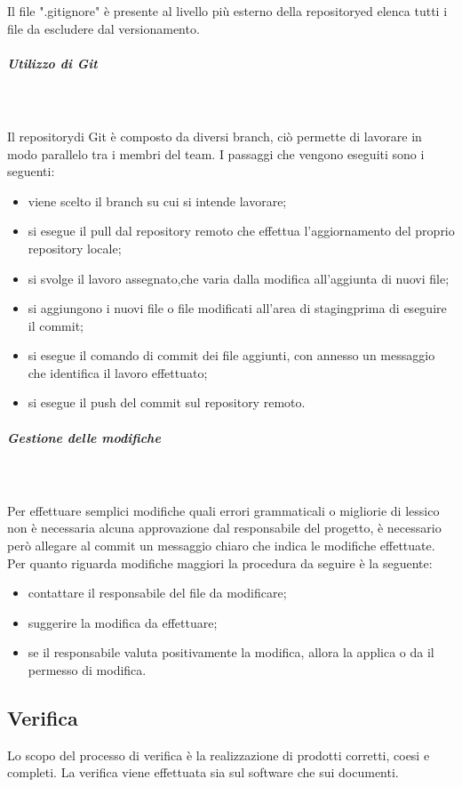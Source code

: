 	Il file ".gitignore" è presente al livello più esterno della repository\glosp ed elenca tutti i file da escludere dal versionamento. 
	\subparagraph{Utilizzo di Git} \mbox{}\\ \mbox{}\\
	Il repository\glosp di Git è composto da diversi branch, ciò permette di lavorare in modo parallelo tra i membri del team.  
	I passaggi che vengono eseguiti sono i seguenti:
	\begin{itemize}
		\item viene scelto il branch su cui si intende lavorare;
		\item si esegue il pull dal repository remoto che effettua l'aggiornamento del proprio repository locale;
		\item si svolge il lavoro assegnato,che varia dalla modifica all'aggiunta di nuovi file;
		\item si aggiungono i nuovi file o file modificati all'area di staging\glosp prima di eseguire il commit;
		\item si esegue il comando di commit dei file aggiunti, con annesso un messaggio che identifica il lavoro effettuato;
		\item si esegue il push del commit sul repository remoto.
	\end{itemize}
	\subparagraph{Gestione delle modifiche} \mbox{}\\ \mbox{}\\
	Per effettuare semplici modifiche quali errori grammaticali o migliorie di lessico non è necessaria alcuna approvazione dal responsabile del progetto, è necessario però allegare al commit un messaggio chiaro che indica le modifiche effettuate.
	Per quanto riguarda modifiche maggiori la procedura da seguire è la seguente:
	\begin{itemize}
		\item contattare il responsabile del file da modificare;
		\item suggerire la modifica da effettuare;
		\item se il responsabile valuta positivamente la modifica, allora la applica o da il permesso di modifica.
	\end{itemize}
		
\subsection{Verifica}
	Lo scopo del processo di verifica è la realizzazione di prodotti corretti, coesi e completi. La verifica viene effettuata sia sul software che sui documenti. 
